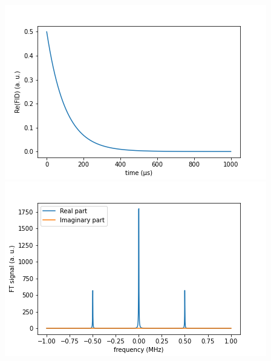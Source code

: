 \documentclass[10pt]{beamer}
\begin{document}
\begin{frame}
$$\begin{columns}[T]
\begin{column}{.5\textwidth}
\begin{column}{.5\textwidth}
\end{column}
\end{column}
\begin{column}{.5\textwidth}
\includegraphics[width=\textwidth]{./spin1-2/34correlated_pure_hyperfineAnisotrop/FIDSignal.png}
\includegraphics[width=\textwidth]{./spin1-2/34correlated_pure_hyperfineAnisotrop/FTSignal.png}
\end{column}
\end{columns}
\end{frame}
\end{document}
